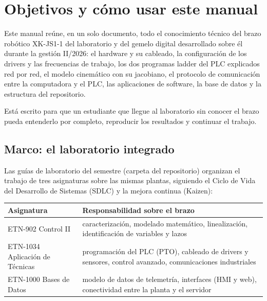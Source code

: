 \chapter{Objetivos y cómo usar este manual}\label{cap:objetivos}

Este manual reúne, en un solo documento, todo el conocimiento técnico del brazo robótico XK-JS1-1 del laboratorio y del gemelo digital desarrollado sobre él durante la gestión II/2026: el hardware y su cableado, la configuración de los drivers y las frecuencias de trabajo, los dos programas ladder del PLC explicados red por red, el modelo cinemático con su jacobiano, el protocolo de comunicación entre la computadora y el PLC, las aplicaciones de software, la base de datos y la estructura del repositorio.

Está escrito para que un estudiante que llegue al laboratorio sin conocer el brazo pueda entenderlo por completo, reproducir los resultados y continuar el trabajo.

\section{Marco: el laboratorio integrado}
Las guías de laboratorio del semestre (carpeta  del repositorio) organizan el trabajo de tres asignaturas sobre las mismas plantas, siguiendo el Ciclo de Vida del Desarrollo de Sistemas (SDLC) y la mejora continua (Kaizen):

\begin{center}\small
\begin{tabularx}{\linewidth}{>{\raggedright}p{3.1cm} >{\raggedright\arraybackslash}X}
\toprule
\textbf{Asignatura} & \textbf{Responsabilidad sobre el brazo}\\
\midrule
ETN-902 Control II & caracterización, modelado matemático, linealización, identificación de variables y lazos\\
ETN-1034 Aplicación de Técnicas & programación del PLC (PTO), cableado de drivers y sensores, control avanzado, comunicaciones industriales\\
ETN-1000 Bases de Datos & modelo de datos de telemetría, interfaces (HMI y web), conectividad entre la planta y el servidor\\
\bottomrule
\end{tabularx}
\end{center}

